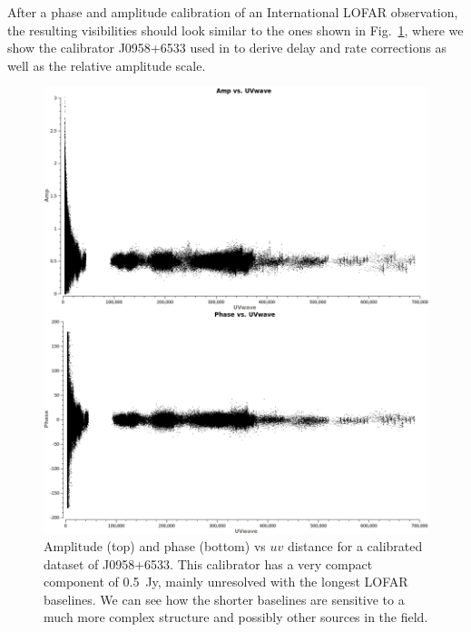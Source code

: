 \documentclass[graybox]{svmult}
\begin{document}
After a phase and amplitude calibration of an International LOFAR observation,
the resulting visibilities should look similar to the ones shown in
Fig.~\ref{fig:radplot}, where we show the calibrator J0958+6533 used in
\cite{varenius15} to derive delay and rate corrections as well as the relative
amplitude scale. 

\begin{figure}[htbp]
\begin{center}
\includegraphics[width=\textwidth]{figures/radplot.png}
\caption{Amplitude (top) and phase (bottom) vs $uv$ distance for a calibrated
dataset of J0958+6533. This calibrator has a very compact component of 0.5~Jy,
mainly unresolved with the longest LOFAR baselines. We can see how the shorter
baselines are sensitive to a much more complex structure and possibly other
sources in the field.}
\label{fig:radplot}
\end{center}
\end{figure}
\end{document}
